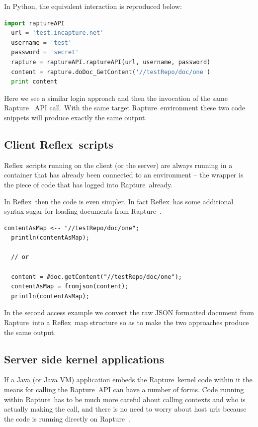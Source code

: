 \documentclass[12pt,twoside,a4paper]{article}
\newcommand{\Rapture}{Rapture~}
\newcommand{\Reflex}{Reflex~}
\begin{document}
In Python, the equivalent interaction is reproduced below:

\begin{lstlisting}[caption={Python simple example}, language=Python]
  import raptureAPI
  url = 'test.incapture.net'
  username = 'test'
  password = 'secret'
  rapture = raptureAPI.raptureAPI(url, username, password)
  content = rapture.doDoc_GetContent('//testRepo/doc/one')
  print content
\end{lstlisting}

Here we see a similar login approach and then the invocation of the same \Rapture
API call. With the same target \Rapture environment these two code snippets will
produce exactly the same output.

\subsection{Client \Reflex scripts}

\Reflex scripts running on the client (or the server) are always running in a
container that has already been connected to an environment -- the wrapper is
the piece of code that has logged into \Rapture already.

In \Reflex then the code is even simpler. In fact \Reflex has some additional
syntax sugar for loading documents from \Rapture.

\begin{lstlisting}[caption={Reflex simple example}, language=reflex]
  contentAsMap <-- "//testRepo/doc/one";
  println(contentAsMap);

  // or

  content = #doc.getContent("//testRepo/doc/one");
  contentAsMap = fromjson(content);
  println(contentAsMap);
\end{lstlisting}

In the second access example we convert the raw JSON formatted document from
\Rapture into a \Reflex map structure so as to make the two approaches produce
the same output.

\subsection{Server side kernel applications}

If a Java (or Java VM) application embeds the \Rapture kernel code within it the
means for calling the \Rapture API can have a number of forms. Code running within
\Rapture has to be much more careful about calling contexts and who is actually
making the call, and there is no need to worry about host urls because the code
is running directly on \Rapture.
\end{document}
